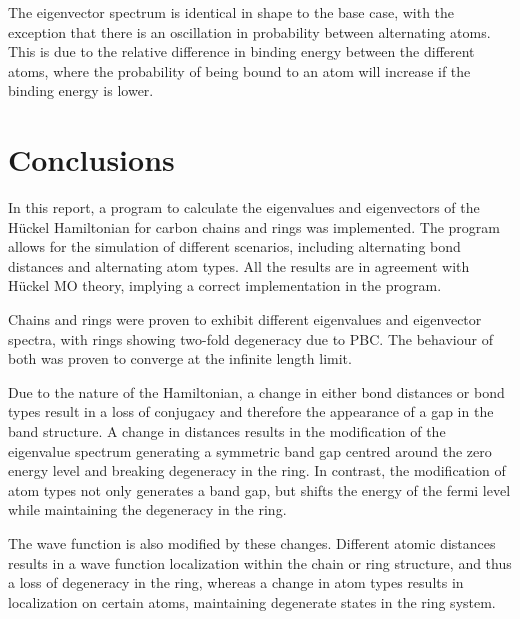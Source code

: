 \documentclass[twocolumn]{article}
\begin{document}
The eigenvector spectrum is identical in shape to the base case, with the exception that there is an oscillation in probability between alternating atoms. This is due to the relative difference in binding energy between the different atoms, where the probability of being bound to an atom will increase if the binding energy is lower. 

\section{Conclusions}
In this report, a program to calculate the eigenvalues and eigenvectors of the Hückel Hamiltonian for carbon chains and rings was implemented. The program allows for the simulation of different scenarios, including alternating bond distances and alternating atom types. All the results are in agreement with Hückel MO theory, implying a correct implementation in the program. 

Chains and rings were proven to exhibit different eigenvalues and eigenvector spectra, with rings showing two-fold degeneracy due to PBC. The behaviour of both was proven to converge at the infinite length limit. 

Due to the nature of the Hamiltonian, a change in either bond distances or bond types result in a loss of conjugacy and therefore the appearance of a gap in the band structure. A change in distances results in the modification of the eigenvalue spectrum generating a symmetric band gap centred around the zero energy level and breaking degeneracy in the ring. In contrast, the modification of atom types not only generates a band gap, but shifts the energy of the fermi level while maintaining the degeneracy in the ring. 

The wave function is also modified by these changes. Different atomic distances results in a wave function localization within the chain or ring structure, and thus a loss of degeneracy in the ring, whereas a change in atom types results in localization on certain atoms, maintaining degenerate states in the ring system.      

\printbibliography
\end{document}
